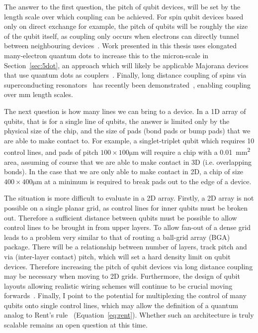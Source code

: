 The answer to the first question, the pitch of qubit devices, will be set by the length scale over which coupling can be achieved. For spin qubit devices based only
on direct exchange for example, the pitch of qubits will be roughly the size of the qubit itself, as coupling only occurs when electrons can directly tunnel between
neighbouring devices~\cite{PhysRevB.86.085423}. Work presented in this thesis uses elongated many-electron quantum dots to increase this to the micron-scale in
Section~\ref{sec:5dot}, an approach which will likely be applicable Majorana devices that use quantum dots as couplers~\cite{PhysRevB.95.235305}. Finally, long
distance coupling of spins via superconducting resonators~\cite{PhysRevB.97.235409} has recently been demonstrated~\cite{2019arXiv190500776B}, enabling coupling
over \si{\milli\meter} length scales.

The next question is how many lines we can bring to a device. In a 1D array of qubits, that is for a single line of qubits, the answer is limited only by the
physical size of the chip, and the size of pads (bond pads or bump pads) that we are able to make contact to. For example, a singlet-triplet qubit which requires
10 control lines, and pads of pitch $100\times100\si{\micro\meter}$ will require a chip with a \SI{0.01}{\square\milli\meter} area, assuming of course that we are
able to make contact in 3D (i.e. overlapping bonds). In the case that we are only able to make contact in 2D, a chip of size $400\times400\si{\micro\meter}$ at a
minimum is required to break pads out to the edge of a device.

The situation is more difficult to evaluate in a 2D array. Firstly, a 2D array is not possible on
a single planar grid, as control lines for inner qubits must be broken out. Therefore a sufficient distance between qubits must be possible to allow control lines
to be brought in from upper layers. To allow fan-out of a dense grid leads to a problem very similar to that of routing a ball-grid array (BGA) package. There will
be a relationship between number of layers, track pitch and via (inter-layer contact) pitch, which will set a hard density limit on qubit devices. Therefore
increasing the pitch of qubit devices via long distance coupling may be necessary when moving to 2D grids. Furthermore, the design of qubit layouts allowing
realistic wiring schemes will continue to be crucial moving forwards~\cite{10.1038/s41534-018-0074-2}. Finally, I point to the potential for multiplexing the
control of many qubits onto single control lines, which may allow the definition of a quantum analog to Rent's rule~\cite{FRANKE20191} (Equation~\ref{eq:rent}).
Whether such an architecture is truly scalable remains an open question at this time.

